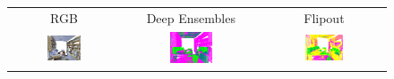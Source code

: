    \begin{figure}[h!]
        \centering
        \begin{tabular}{ccc}
            RGB & Deep Ensembles & Flipout \\
            \includegraphics[width=0.33\textwidth, height=0.18\textheight]{images/seg_output/s3dis_DE/S3DIS_1_RGB.png} &
            \includegraphics[width=0.33\textwidth, height=0.18\textheight]{images/seg_output/s3dis_DE/S3DIS_1_Pred.png} &
            \includegraphics[width=0.33\textwidth, height=0.18\textheight]{images/seg_output/s3dis_DE/office_3.png} \\


\end{tabular}
\end{figure}
